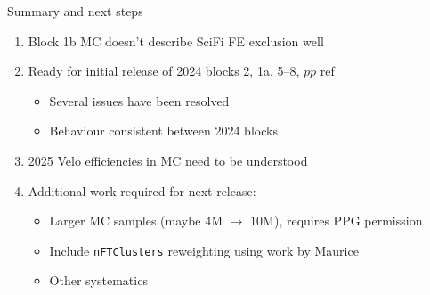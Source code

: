 \documentclass[xcolor={dvipsnames}]{beamer}
\begin{document}
\begin{frame}{Summary and next steps}
  \vspace{0.0cm}
  \begin{enumerate}
    \setlength\itemsep{1.0em}
    \item{Block 1b MC doesn't describe SciFi FE exclusion well}
    \item{Ready for initial release of 2024 blocks 2, 1a, 5--8, $pp$ ref}
    \begin{itemize}
      \item{Several issues have been resolved}
      \item{Behaviour consistent between 2024 blocks}
    \end{itemize}
    \item{2025 Velo efficiencies in MC need to be understood}
    \item{Additional work required for next release:}
    \begin{itemize}
      \item{Larger MC samples (maybe 4M $\to$ 10M), requires PPG permission}
      \item{Include \texttt{nFTClusters} reweighting using work by Maurice}
      \item{Other systematics}
    \end{itemize}
  \end{enumerate}
\end{frame}
\end{document}
